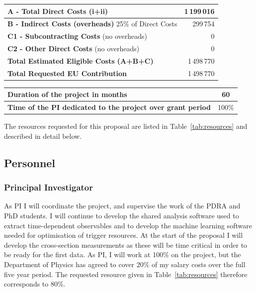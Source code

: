 \documentclass[11pt,a4paper]{article}
\begin{document}
\begin{table}[!htb]
\begin{tabular}{|l|l|l|r|}
    \multicolumn{3}{|l|}{{\bfseries A - Total Direct Costs (i+ii)}}  & 1\,199\,016 \\ \hline
    \multicolumn{3}{|l|}{{\bfseries B - Indirect Costs (overheads)} 25\% of Direct Costs }  & 299\,754 \\ \hline
    \multicolumn{3}{|l|}{{\bfseries C1 - Subcontracting Costs} (no overheads)}  & 0  \\ \hline
    \multicolumn{3}{|l|}{{\bfseries C2 - Other Direct Costs} (no overheads)}  & 0 \\ \hline
    \multicolumn{3}{|l|}{{\bfseries Total Estimated Eligible Costs (A+B+C)}}  & 1\,498\,770 \\ \hline
    \multicolumn{3}{|l|}{{\bfseries Total Requested EU Contribution }}  &   1\,498\,770  \\ \hline
  \end{tabular}

\vspace{0.3cm}
  \begin{tabular}{|l|c|}\hline
     \bfseries Duration of the project in months & 60 \\ \hline
     \bfseries Time of the PI dedicated to the project over grant period & 100\% \\ \hline
  \end{tabular}
\end{table}

The resources requested for this proposal are listed in Table~\ref{tab:resources} and described in detail below. 

\subsection{Personnel}

\subsubsection{Principal Investigator} 
As PI I will coordinate the project, and supervise the work of the PDRA and PhD students. I will continue to develop the shared analysis software used to extract time-dependent \CPv observables and to develop the machine learning software needed for optimisation of trigger resources. At the start of the proposal I will develop the cross-section measurements as these will be time critical in order to be ready for the first data. As PI, I will work at 100\% on the project, but the Department of Physics has agreed to cover 20\% of my salary costs over the full five year period. The requested resource given in Table~\ref{tab:resources} therefore corresponds to 80\%. 
\end{document}
